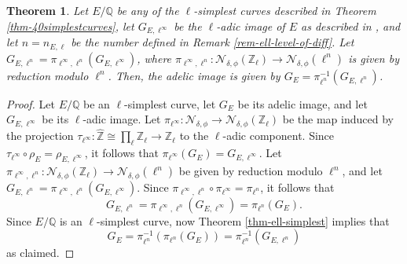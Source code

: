 \documentclass[11pt]{amsart}
\newtheorem{theorem}[defn]{Theorem}
\theoremstyle{definition}
\newcommand{\Q}{\mathbb{Q}}
\newcommand{\Z}{\mathbb{Z}}
\begin{document}
\begin{theorem}\label{thm-adelicimageofsimplestcurves}
    Let $E/\Q$ be any of the $\ell$-simplest curves described in Theorem \ref{thm-40simplestcurves}, let $G_{E,\ell^\infty}$ be the $\ell$-adic image of $E$ as described in \cite{modelspaper}, and let $n=n_{E,\ell}$ be the number defined in Remark \ref{rem-ell-level-of-diff}. Let $G_{E,\ell^n}=\pi_{\ell^\infty,\ell^{n}}(G_{E,\ell^\infty})$, where $\pi_{\ell^\infty,\ell^n}\colon  \mathcal{N}
_{\delta, \phi}(\Z_\ell) \to \mathcal{N}_{\delta, \phi}(\ell^n)$ is given by reduction modulo $\ell^n$. Then, the adelic image is given by $G_E=\pi_{\ell^{n}}^{-1}(G_{E,\ell^n})$.
\end{theorem}
\begin{proof}
    Let $E/\Q$ be an $\ell$-simplest curve, let $G_E$ be its adelic image, and let $G_{E,\ell^\infty}$ be its $\ell$-adic image. Let $\pi_{\ell^\infty}\colon  \mathcal{N}
_{\delta, \phi} \to \mathcal{N}_{\delta, \phi}(\Z_{\ell})$ be the map induced by the projection $\tau_{\ell^\infty}\colon \widehat{\Z}\cong \prod_\ell \Z_\ell\to \Z_{\ell}$ to the $\ell$-adic component. Since $\tau_{\ell^\infty}\circ \rho_E = \rho_{E,\ell^\infty}$, it follows that $\pi_{\ell^\infty}(G_E)=G_{E,\ell^\infty}$. Let $\pi_{\ell^\infty,\ell^n}\colon  \mathcal{N}
_{\delta, \phi}(\Z_\ell) \to \mathcal{N}_{\delta, \phi}(\ell^n)$ be given by reduction modulo $\ell^n$, and let $G_{E,\ell^n}=\pi_{\ell^\infty,\ell^{n}}(G_{E,\ell^\infty})$.  Since $\pi_{\ell^\infty,\ell^n} \circ \pi_{\ell^\infty} = \pi_{\ell^n}$, it follows that 
$$G_{E,\ell^n}=\pi_{\ell^\infty,\ell^n}(G_{E,\ell^\infty}) = \pi_{\ell^n}(G_E).$$
Since $E/\Q$ is an $\ell$-simplest curve, now Theorem \ref{thm-ell-simplest} implies that $$G_E=\pi_{\ell^{n}}^{-1}(\pi_{\ell^n}(G_{E}))=\pi_{\ell^{n}}^{-1}(G_{E,\ell^n})$$ as claimed.
\end{proof}
\end{document}
